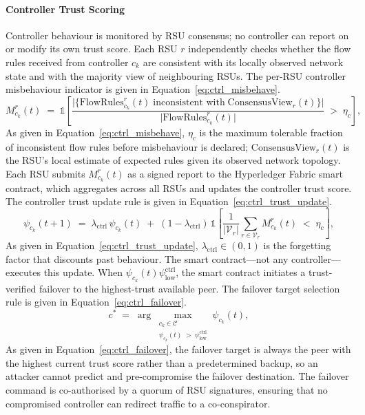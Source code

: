 \paragraph{Controller Trust Scoring}
\label{sec:ctrl_trust}

Controller behaviour is monitored by RSU consensus; no controller
can report on or modify its own trust score. Each RSU $r$
independently checks whether the flow rules received from
controller $c_k$ are consistent with its locally observed
network state and with the majority view of neighbouring RSUs.
The per-RSU controller misbehaviour indicator is given in
Equation~\eqref{eq:ctrl_misbehave}.
%
\begin{equation}
  M_{c_k}^{r}(t) \;=\; \mathbb{1}\!\left[
    \frac{
      \bigl|\{\text{FlowRules}_{c_k}^{r}(t)\;
             \text{inconsistent with}\;
             \mathrm{ConsensusView}_{r}(t)\}\bigr|
    }{
      \bigl|\text{FlowRules}_{c_k}^{r}(t)\bigr|
    } \;>\; \eta_c
  \right],
  \label{eq:ctrl_misbehave}
\end{equation}
%
As given in Equation~\eqref{eq:ctrl_misbehave}, $\eta_c$ is the
maximum tolerable fraction of inconsistent flow rules before
misbehaviour is declared; $\mathrm{ConsensusView}_{r}(t)$ is the
RSU's local estimate of expected rules given its observed network
topology. Each RSU submits $M_{c_k}^{r}(t)$ as a signed report
to the Hyperledger Fabric smart contract, which aggregates across
all RSUs and updates the controller trust score. The controller
trust update rule is given in
Equation~\eqref{eq:ctrl_trust_update}.
%
\begin{equation}
  \psi_{c_k}(t{+}1) \;=\;
    \lambda_{\mathrm{ctrl}}\,\psi_{c_k}(t)
    \;+\;
    (1-\lambda_{\mathrm{ctrl}})\,
    \mathbb{1}\!\left[
      \frac{1}{|\mathcal{V}_r|}
      \sum_{r \in \mathcal{V}_r} M_{c_k}^{r}(t)
      \;<\; \eta_c
    \right],
  \label{eq:ctrl_trust_update}
\end{equation}
%
As given in Equation~\eqref{eq:ctrl_trust_update},
$\lambda_{\mathrm{ctrl}} \in (0,1)$ is the forgetting factor
that discounts past behaviour. The smart contract---not any
controller---executes this update. When $\psi_{c_k}(t) 
\psi_{\mathrm{low}}^{\mathrm{ctrl}}$, the smart contract
initiates a trust-verified failover to the highest-trust
available peer. The failover target selection rule is given in
Equation~\eqref{eq:ctrl_failover}.
%
\begin{equation}
  c^{*} \;=\;
    \arg\max_{\substack{c_k \in \mathcal{C} \\ \psi_{c_k}(t)\;>\;\psi_{\mathrm{low}}^{\mathrm{ctrl}}}}
    \psi_{c_k}(t),
  \label{eq:ctrl_failover}
\end{equation}
%
As given in Equation~\eqref{eq:ctrl_failover}, the failover
target is always the peer with the highest current trust score
rather than a predetermined backup, so an attacker cannot
predict and pre-compromise the failover destination. The failover
command is co-authorised by a quorum of RSU signatures, ensuring
that no compromised controller can redirect traffic to a
co-conspirator.

